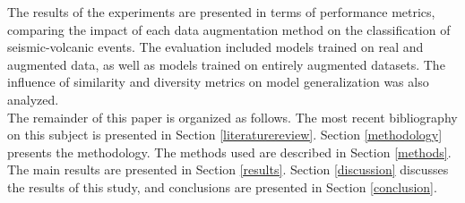 \documentclass[journal]{IEEEtran}
\begin{document}
The results of the experiments are presented in terms of performance metrics, comparing the impact of each data augmentation method on the classification of seismic-volcanic events. The evaluation included models trained on real and augmented data, as well as models trained on entirely augmented datasets. The influence of similarity and diversity metrics on model generalization was also analyzed.\\
The remainder of this paper is organized as follows. The most recent bibliography on this subject is presented in Section \ref{literaturereview}. Section \ref{methodology} presents the methodology. The methods used are described in Section \ref{methods}. The main results are presented in Section \ref{results}. Section \ref{discussion} discusses the results of this study, and conclusions are presented in Section \ref{conclusion}.
\end{document}
